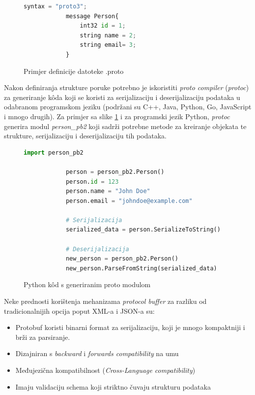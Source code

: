 \documentclass[zavrsnirad]{fer}
\begin{document}
\begin{figure}[H]
	\centering
	\begin{minipage}{0.6\linewidth}
		\begin{lstlisting}[language=Python]
			syntax = "proto3";
			message Person{
				int32 id = 1;
				string name = 2;
				string email= 3;
			}
		\end{lstlisting}
	\end{minipage}
	\caption{Primjer definicije datoteke .proto}
	\label{slk:proto}
\end{figure}
\newpage		
	Nakon definiranja strukture poruke potrebno je iskoristiti \textit{proto compiler} (\textit{protoc}) za generiranje k\^oda koji se koristi za serijalizaciju i deserijalizaciju podataka u odabranom programskom jeziku (podržani su C++, Java, Python, Go, JavaScript i mnogo drugih). Za primjer sa slike \ref{slk:proto} i za programski jezik Python, \textit{protoc} generira modul \textit{person\_pb2} koji sadrži potrebne metode za kreiranje objekata te strukture, serijalizaciju i deserijalizaciju tih podataka. 

\begin{figure}[H]
	\centering
	\begin{minipage}{0.8\linewidth}
		\begin{lstlisting}[language=Python]
			import person_pb2
			
			person = person_pb2.Person()
			person.id = 123
			person.name = "John Doe"
			person.email = "johndoe@example.com"
			
			# Serijalizacija
			serialized_data = person.SerializeToString()
			
			# Deserijalizacija
			new_person = person_pb2.Person()
			new_person.ParseFromString(serialized_data)
		\end{lstlisting}
	\end{minipage}
	\caption{Python k\^od s generiranim proto modulom}
	\label{slk:proto_kod}
\end{figure}

Neke prednosti korištenja mehanizama \textit{protocol buffer} za razliku od tradicionalnijih opcija poput XML-a i JSON-a su:

\begin{itemize}
	\item Protobuf koristi binarni format za serijalizaciju, koji je mnogo kompaktniji i brži za parsiranje.
	\item Dizajniran s \textit{backward} i \textit{forwards compatibility} na umu 
	\item Međujezična kompatibilnost (\textit{Cross-Language compatibility})
	\item Imaju validaciju schema koji striktno čuvaju strukturu podataka
\end{itemize}
\end{document}
